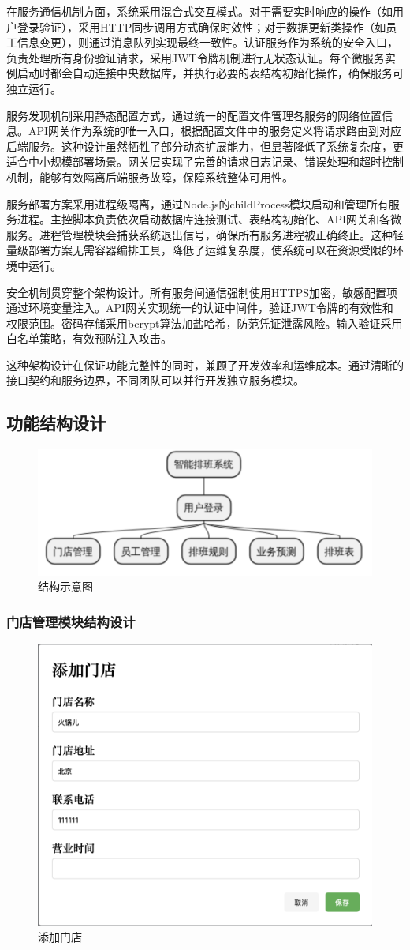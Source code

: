 \documentclass{ctexart}
\begin{document}
在服务通信机制方面，系统采用混合式交互模式。对于需要实时响应的操作（如用户登录验证），采用HTTP同步调用方式确保时效性；对于数据更新类操作（如员工信息变更），则通过消息队列实现最终一致性。认证服务作为系统的安全入口，负责处理所有身份验证请求，采用JWT令牌机制进行无状态认证。每个微服务实例启动时都会自动连接中央数据库，并执行必要的表结构初始化操作，确保服务可独立运行。

服务发现机制采用静态配置方式，通过统一的配置文件管理各服务的网络位置信息。API网关作为系统的唯一入口，根据配置文件中的服务定义将请求路由到对应后端服务。这种设计虽然牺牲了部分动态扩展能力，但显著降低了系统复杂度，更适合中小规模部署场景。网关层实现了完善的请求日志记录、错误处理和超时控制机制，能够有效隔离后端服务故障，保障系统整体可用性。

服务部署方案采用进程级隔离，通过Node.js的childProcess模块启动和管理所有服务进程。主控脚本负责依次启动数据库连接测试、表结构初始化、API网关和各微服务。进程管理模块会捕获系统退出信号，确保所有服务进程被正确终止。这种轻量级部署方案无需容器编排工具，降低了运维复杂度，使系统可以在资源受限的环境中运行。

安全机制贯穿整个架构设计。所有服务间通信强制使用HTTPS加密，敏感配置项通过环境变量注入。API网关实现统一的认证中间件，验证JWT令牌的有效性和权限范围。密码存储采用bcrypt算法加盐哈希，防范凭证泄露风险。输入验证采用白名单策略，有效预防注入攻击。

这种架构设计在保证功能完整性的同时，兼顾了开发效率和运维成本。通过清晰的接口契约和服务边界，不同团队可以并行开发独立服务模块。


\subsection{功能结构设计}
\begin{figure}[H]
    \centering
    \includegraphics[width=0.8\linewidth]{./source/结构示意图.png}
    \caption{结构示意图}
\end{figure}
\subsubsection{门店管理模块结构设计}
\begin{figure}[H]
    \centering
    \includegraphics[width=0.5\linewidth]{./source/添加门店.png}
    \caption{添加门店}
\end{figure}
\end{document}
